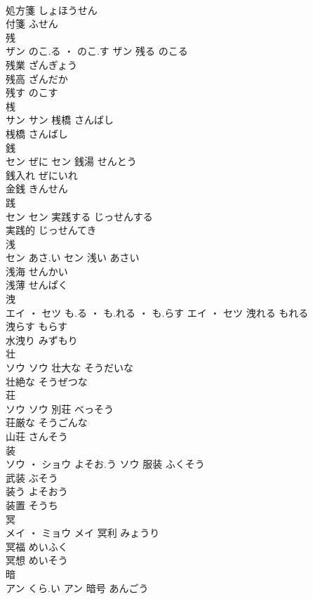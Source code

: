 \documentclass[8pt]{extreport}
\begin{document}
\begin{CJK}{UTF8}{min}
\\	処方箋	しょほうせん	
\\	付箋	ふせん	
\\	残	
\\	ザン	のこ.る ・ のこ.す	ザン	残る	のこる	
\\	残業	ざんぎょう	
\\	残高	ざんだか	
\\	残す	のこす	
\\	桟	
\\	サン		サン	桟橋	さんばし	
\\	桟橋	さんばし	
\\	銭	
\\	セン	ぜに	セン	銭湯	せんとう	
\\	銭入れ	ぜにいれ	
\\	金銭	きんせん	
\\	践	
\\	セン		セン	実践する	じっせんする	
\\	実践的	じっせんてき	
\\	浅	
\\	セン	あさ.い	セン	浅い	あさい	
\\	浅海	せんかい	
\\	浅薄	せんぱく	
\\	洩	
\\	エイ ・ セツ	も.る ・ も.れる ・ も.らす	エイ ・ セツ	洩れる	もれる	
\\	洩らす	もらす	
\\	水洩り	みずもり	
\\	壮	
\\	ソウ		ソウ	壮大な	そうだいな	
\\	壮絶な	そうぜつな	
\\	荘	
\\	ソウ		ソウ	別荘	べっそう	
\\	荘厳な	そうごんな	
\\	山荘	さんそう	
\\	装	
\\	ソウ ・ ショウ	よそお.う	ソウ	服装	ふくそう	
\\	武装	ぶそう	
\\	装う	よそおう	
\\	装置	そうち	
\\	冥	
\\	メイ ・ ミョウ		メイ	冥利	みょうり	
\\	冥福	めいふく	
\\	冥想	めいそう	
\\	暗	
\\	アン	くら.い	アン	暗号	あんごう	

\end{CJK}
\end{document}
